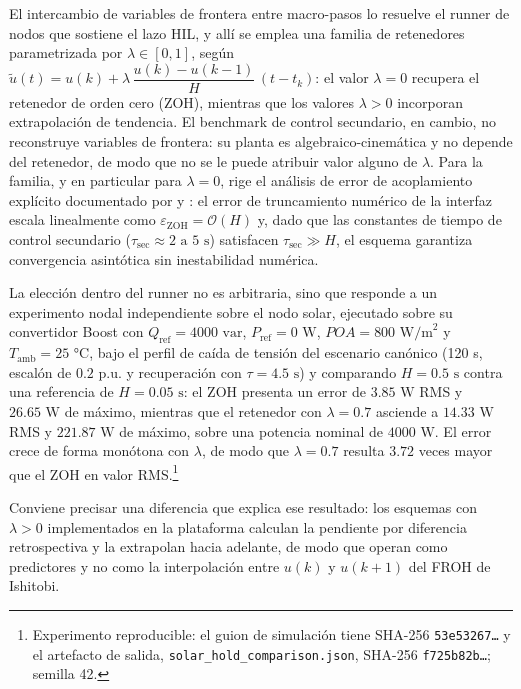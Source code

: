 El intercambio de variables de frontera entre macro-pasos lo resuelve el runner de nodos que sostiene el lazo HIL, y allí se emplea una familia de retenedores parametrizada por $\lambda \in [0,1]$, según $\tilde{u}(t) = u(k) + \lambda\,\dfrac{u(k)-u(k-1)}{H}\,(t-t_k)$: el valor $\lambda = 0$ recupera el retenedor de orden cero (ZOH), mientras que los valores $\lambda > 0$ incorporan extrapolación de tendencia. El benchmark de control secundario, en cambio, no reconstruye variables de frontera: su planta es algebraico-cinemática y no depende del retenedor, de modo que no se le puede atribuir valor alguno de $\lambda$. Para la familia, y en particular para $\lambda = 0$, rige el análisis de error de acoplamiento explícito documentado por \citet{Kyllingstad2025CosimErrors} y \citet{Haid2022CosimCorrector}: el error de truncamiento numérico de la interfaz escala linealmente como $\varepsilon_{\text{ZOH}} = \mathcal{O}(H)$ y, dado que las constantes de tiempo de control secundario ($\tau_{\text{sec}} \approx 2\text{ a }5\text{ s}$) satisfacen $\tau_{\text{sec}} \gg H$, el esquema garantiza convergencia asintótica sin inestabilidad numérica.

La elección dentro del runner no es arbitraria, sino que responde a un experimento nodal independiente sobre el nodo solar, ejecutado sobre su convertidor Boost con $Q_{\text{ref}} = 4000\text{ var}$, $P_{\text{ref}} = 0\text{ W}$, $POA = 800\text{ W/m}^2$ y $T_{\text{amb}} = 25\text{ °C}$, bajo el perfil de caída de tensión del escenario canónico (120 s, escalón de $0.2\text{ p.u.}$ y recuperación con $\tau = 4.5\text{ s}$) y comparando $H = 0.5\text{ s}$ contra una referencia de $H = 0.05\text{ s}$: el ZOH presenta un error de $3.85\text{ W}$ RMS y $26.65\text{ W}$ de máximo, mientras que el retenedor con $\lambda = 0.7$ asciende a $14.33\text{ W}$ RMS y $221.87\text{ W}$ de máximo, sobre una potencia nominal de $4000\text{ W}$. El error crece de forma monótona con $\lambda$, de modo que $\lambda = 0.7$ resulta $3.72$ veces mayor que el ZOH en valor RMS.\footnote{Experimento reproducible: el guion de simulación tiene SHA-256 \texttt{53e53267\ldots} y el artefacto de salida, \texttt{solar\_hold\_comparison.json}, SHA-256 \texttt{f725b82b\ldots}; semilla 42.}

Conviene precisar una diferencia que explica ese resultado: los esquemas con $\lambda > 0$ implementados en la plataforma calculan la pendiente por diferencia retrospectiva y la extrapolan hacia adelante, de modo que operan como predictores y no como la interpolación entre $u(k)$ y $u(k+1)$ del FROH de Ishitobi.

